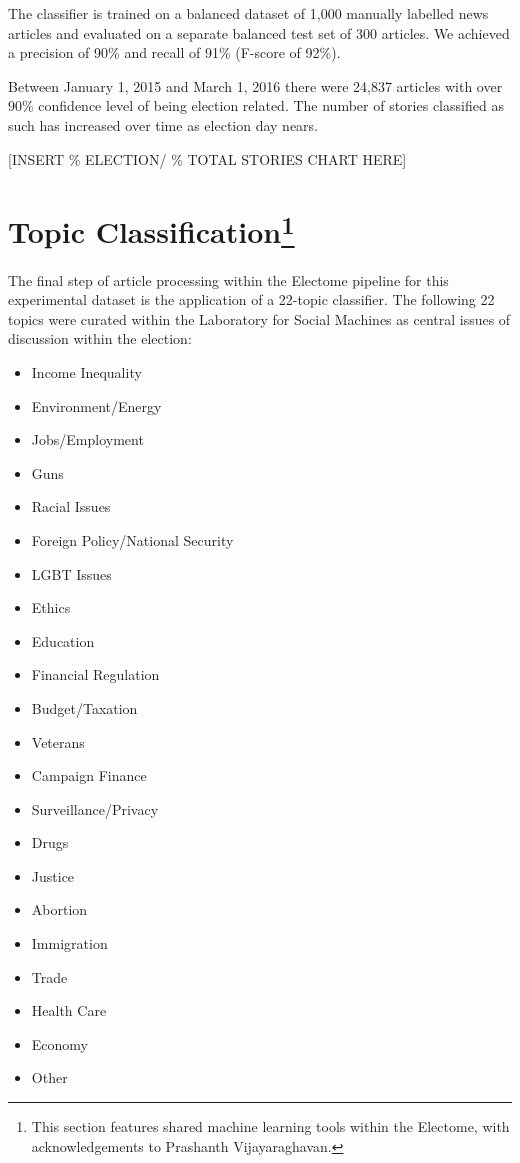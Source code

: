 The classifier is trained on a balanced dataset of 1,000 manually labelled news articles and evaluated on a separate balanced test set of 300 articles. We achieved a precision of 90\% and recall of 91\% (F-score of 92\%). 

Between January 1, 2015 and March 1, 2016 there were 24,837 articles with over 90\% confidence level of being election related. The number of stories classified as such has increased over time as election day nears. 

[INSERT \% ELECTION/ \% TOTAL STORIES CHART HERE]

\newpage
\section[Topic Classification] {Topic Classification\footnote{This section features shared machine learning tools within the Electome, with acknowledgements to Prashanth Vijayaraghavan.}} 

The final step of article processing within the Electome pipeline for this experimental dataset is the application of a 22-topic classifier. The following 22 topics were curated within the Laboratory for Social Machines as central issues of discussion within the election:

\begin{multicols}{2}
    \begin{itemize}
    \itemsep-1em 
      \item Income Inequality
      \item Environment/Energy
      \item Jobs/Employment
      \item Guns
      \item Racial Issues
      \item Foreign Policy/National Security
      \item LGBT Issues
      \item Ethics
      \item Education
      \item Financial Regulation
      \item Budget/Taxation
      \item Veterans
      \item Campaign Finance
      \item Surveillance/Privacy
      \item Drugs
      \item Justice
      \item Abortion
      \item Immigration
      \item Trade
      \item Health Care
      \item Economy
      \item Other 
    \end{itemize}
\end{multicols}
 
